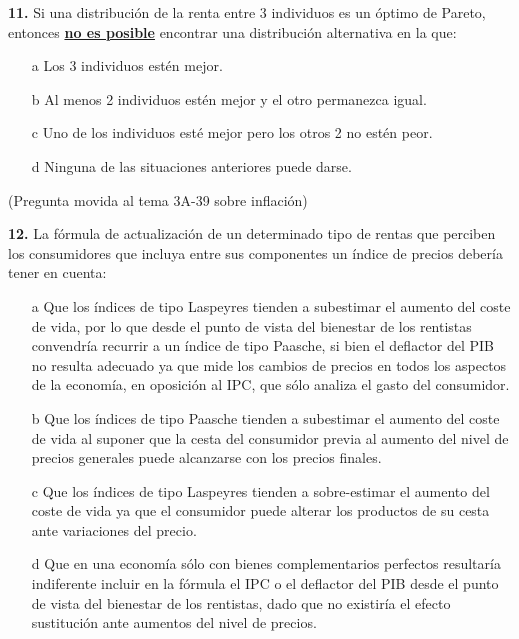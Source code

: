 \documentclass{nuevotema}
\begin{document}
\preguntas


\textbf{11.} Si una distribución de la renta entre 3 individuos es un óptimo de Pareto, entonces \underline{\textbf{no es posible}} encontrar una distribución alternativa en la que:

\begin{itemize}
	\item[a] Los 3 individuos estén mejor.
	\item[b] Al menos 2 individuos estén mejor y el otro permanezca igual.
	\item[c] Uno de los individuos esté mejor pero los otros 2 no estén peor.
	\item[d] Ninguna de las situaciones anteriores puede darse.
\end{itemize}


(Pregunta movida al tema 3A-39 sobre inflación)

\textbf{12.} La fórmula de actualización de un determinado tipo de rentas que perciben los consumidores que incluya entre sus componentes un índice de precios debería tener en cuenta:

\begin{itemize}
	\item[a] Que los índices de tipo Laspeyres tienden a subestimar el aumento del coste de vida, por lo que desde el punto de vista del bienestar de los rentistas convendría recurrir a un índice de tipo Paasche, si bien el deflactor del PIB no resulta adecuado ya que mide los cambios de precios en todos los aspectos de la economía, en oposición al IPC, que sólo analiza el gasto del consumidor.
	\item[b] Que los índices de tipo Paasche tienden a subestimar el aumento del coste de vida al suponer que la cesta del consumidor previa al aumento del nivel de precios generales puede alcanzarse con los precios finales.
	\item[c] Que los índices de tipo Laspeyres tienden a sobre-estimar el aumento del coste de vida ya que el consumidor puede alterar los productos de su cesta ante variaciones del precio.
	\item[d] Que en una economía sólo con bienes complementarios perfectos resultaría indiferente incluir en la fórmula el IPC o el deflactor del PIB desde el punto de vista del bienestar de los rentistas, dado que no existiría el efecto sustitución ante aumentos del nivel de precios.
\end{itemize}
\end{document}
